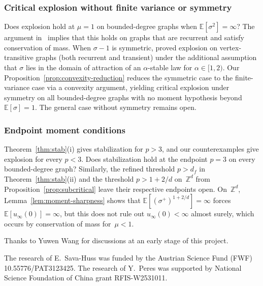 \documentclass[aop]{imsart}
\theoremstyle{plain}
\theoremstyle{definition}
\newcommand{\Z}{\mathbb{Z}}
\newcommand{\E}{\mathbb{E}}
\begin{document}
	\subsubsection*{Critical explosion without finite variance or symmetry}
	
	Does explosion hold at $\mu=1$ on bounded-degree graphs when $\E[\sigma^2]=\infty$? 
	The argument in~\citet{div-sand-crit} implies that this holds on graphs that are recurrent and satisfy conservation of mass. When $\sigma-1$ is symmetric, \citet*{MR3834853} proved explosion on vertex-transitive graphs (both recurrent and transient) under the additional assumption that $\sigma$ lies in the domain of attraction of an $\alpha$-stable law for $\alpha\in[1,2)$. Our Proposition~\ref{prop:convexity-reduction} reduces the symmetric case to the finite-variance case via a convexity argument, yielding critical explosion under symmetry on all bounded-degree graphs with no moment hypothesis beyond~$\E[\sigma]=1$. The general case without symmetry remains open.
	
	\subsubsection*{Endpoint moment conditions}
	
	Theorem~\ref{thm:stab}(i) gives stabilization for $p>3$, and our counterexamples give explosion for every $p<3$. Does stabilization hold at the endpoint $p=3$ on every bounded-degree graph? Similarly, the refined threshold $p>d_f$ in Theorem~\ref{thm:stab}(ii) and the threshold $p>1+2/d$ on~$\Z^d$ from Proposition~\ref{prop:subcritical} leave their respective endpoints open. On~$\Z^d$, Lemma~\ref{lem:moment-sharpness} shows that $\E[(\sigma^+)^{1+2/d}]=\infty$ forces $\E[u_\infty(0)]=\infty$, but this does not rule out $u_\infty(0)<\infty$ almost surely, which occurs by conservation of mass for~$\mu < 1$. 
	
\begin{acks}[Acknowledgments]
Thanks to Yuwen Wang for discussions at an early stage of this project.
\end{acks}

\begin{funding}
The research of E.\ Sava-Huss was funded by the Austrian Science Fund (FWF) 10.55776/\allowbreak{}PAT3123425.
The research of Y.\ Peres was supported by National Science Foundation of China grant RFIS-W2531011.
\end{funding}



\end{document}
